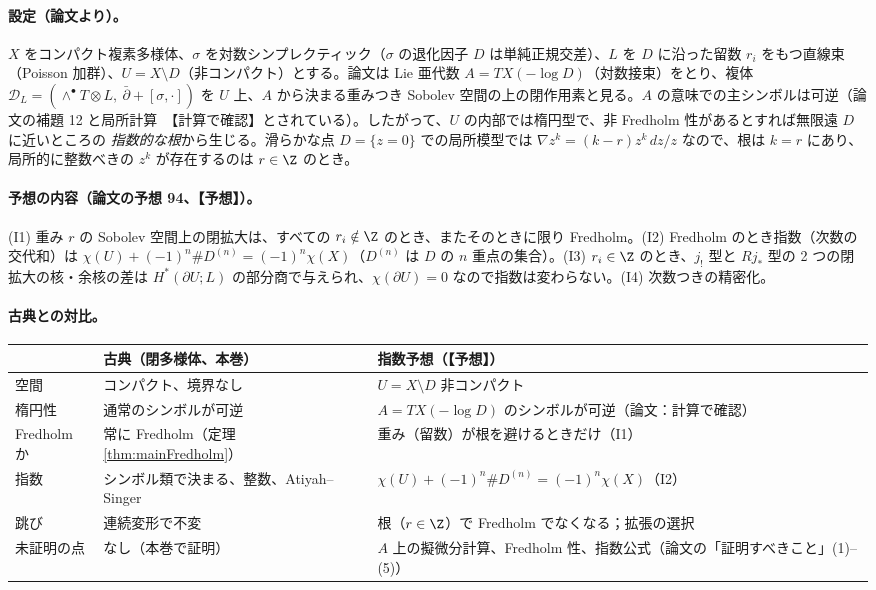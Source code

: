 \paragraph{設定（論文より）。}$X$ をコンパクト複素多様体、$\sigma$ を対数シンプレクティック（$\sigma$ の退化因子 $D$ は単純正規交差）、$L$ を $D$ に沿った留数 $r_i$ をもつ直線束（Poisson 加群）、$U=X\setminus D$（非コンパクト）とする。論文は Lie 亜代数 $A=TX(-\log D)$（対数接束）をとり、複体 $\mathcal D_L=(\wedge^\bullet T\otimes L,\ \bar\partial+[\sigma,\cdot])$ を $U$ 上、$A$ から決まる重みつき Sobolev 空間の上の閉作用素と見る。$A$ の意味での主シンボルは可逆（論文の補題 12 と局所計算\ 【計算で確認】とされている）。したがって、$U$ の内部では楕円型で、非 Fredholm 性があるとすれば無限遠 $D$ に近いところの \emph{指数的な根}から生じる。滑らかな点 $D=\{z=0\}$ での局所模型では $\nabla z^k=(k-r)z^k\,dz/z$ なので、根は $k=r$ にあり、局所的に整数べきの $z^k$ が存在するのは $r\in\Z$ のとき。
\paragraph{予想の内容（論文の予想 94、【予想】）。}(I1) 重み $r$ の Sobolev 空間上の閉拡大は、すべての $r_i\notin\Z$ のとき、またそのときに限り Fredholm。(I2) Fredholm のとき指数（次数の交代和）は $\chi(U)+(-1)^n\#D^{(n)}=(-1)^n\chi(X)$（$D^{(n)}$ は $D$ の $n$ 重点の集合）。(I3) $r_i\in\Z$ のとき、$j_!$ 型と $Rj_*$ 型の 2 つの閉拡大の核・余核の差は $H^*(\partial U;L)$ の部分商で与えられ、$\chi(\partial U)=0$ なので指数は変わらない。(I4) 次数つきの精密化。
\paragraph{古典との対比。}
\begin{center}
\renewcommand{\arraystretch}{1.2}
\begin{tabular}{>{\raggedright\arraybackslash}p{3.6cm}>{\raggedright\arraybackslash}p{5.6cm}>{\raggedright\arraybackslash}p{5.0cm}}
\toprule
 & 古典（閉多様体、本巻） & 指数予想（【予想】）\\
\midrule
空間 & コンパクト、境界なし & $U=X\setminus D$ 非コンパクト\\
楕円性 & 通常のシンボルが可逆 & $A=TX(-\log D)$ のシンボルが可逆（論文：計算で確認）\\
Fredholm か & 常に Fredholm（定理 \ref{thm:mainFredholm}） & 重み（留数）が根を避けるときだけ（I1）\\
指数 & シンボル類で決まる、整数、Atiyah--Singer & $\chi(U)+(-1)^n\#D^{(n)}=(-1)^n\chi(X)$（I2）\\
跳び & 連続変形で不変 & 根（$r\in\Z$）で Fredholm でなくなる；拡張の選択\\
未証明の点 & なし（本巻で証明） & $A$ 上の擬微分計算、Fredholm 性、指数公式（論文の「証明すべきこと」(1)--(5)）\\
\bottomrule
\end{tabular}
\end{center}

